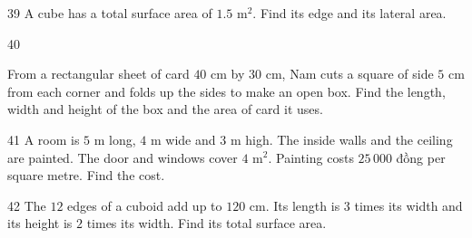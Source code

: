 \gap
\begin{probbox}{39}{}
A cube has a total surface area of $1.5$ m$^2$. Find its edge and its lateral area.
\end{probbox}
\gap
\begin{probbox}{40}{}
\begin{minipage}[t]{0.6\linewidth}
From a rectangular sheet of card $40$ cm by $30$ cm, Nam cuts a square of side $5$ cm from each corner and folds up the sides to make an open box. Find the length, width and height of the box and the area of card it uses.
\end{minipage}\hfill
\begin{minipage}[t]{0.36\linewidth}\vspace{0pt}\centering
{}
\end{minipage}
\end{probbox}
\gap
\begin{probbox}{41}{}
A room is $5$ m long, $4$ m wide and $3$ m high. The inside walls and the ceiling are painted. The door and windows cover $4$ m$^2$. Painting costs $25\,000$ đồng per square metre. Find the cost.
\end{probbox}
\gap
\begin{probbox}{42}{}
The $12$ edges of a cuboid add up to $120$ cm. Its length is $3$ times its width and its height is $2$ times its width. Find its total surface area.
\end{probbox}
